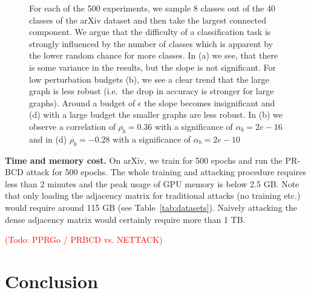 \documentclass[sigconf,authordraft]{acmart}
\newcommand{\todo}[1]{\textcolor{red}{(Todo: #1)}}
\begin{document}
\begin{figure*}[t]
  \centering
  \caption{For each of the 500 experiments, we sample 8 classes out of the 40 classes of the arXiv dataset and then take the largest connected component. We argue that the difficulty of a classification task is strongly influenced by the number of classes which is apparent by the lower random chance for more classes. In (a) we see, that there is some variance in the results, but the slope is not significant. For low perturbation budgets (b), we see a clear trend that the large graph is less robust (i.e.\ the  drop in accuracy is stronger for large graphs). Around a budget of \(\epsilon\) the slope becomes insignificant and (d) with a large budget the smaller graphs are less robust. In (b) we observe a correlation of \(\rho_b=0.36\) with a significance of \(\alpha_b=2e-16\) and in (d) \(\rho_b=-0.28\) with a significance of \(\alpha_b=2e-10\) \label{fig:graphsizevsrobustness}}
\end{figure*}

\textbf{Time and memory cost.} On arXiv, we train for 500 epochs and run the PR-BCD attack for 500 epochs. The whole training and attacking procedure requires less than 2 minutes and the peak usage of GPU memory is below 2.5 GB.
Note that only loading the adjacency matrix for traditional attacks (no training etc.) would require around 115 GB (see Table~\ref{tab:datasets}). Naively attacking the dense adjacency matrix would certainly require more than 1 TB.

\todo{PPRGo / PRBCD vs. NETTACK}

\section{Conclusion}\label{sec:conclusion} %
\end{document}
